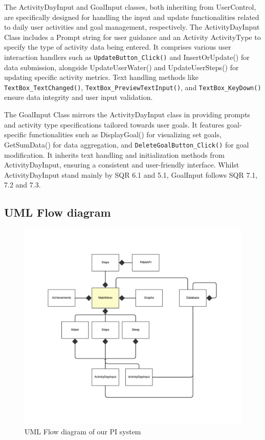 \documentclass[12pt]{article}
\begin{document}
The ActivityDayInput and GoalInput classes, both inheriting from UserControl,
are specifically designed for handling the input and update functionalities
related to daily user activities and goal management, respectively. The
ActivityDayInput Class includes a Prompt string for user guidance and an
Activity ActivityType to specify the type of activity data being entered. It
comprises various user interaction handlers such as \texttt{UpdateButton\_Click()} and
InsertOrUpdate() for data submission, alongside UpdateUserWater() and
UpdateUserSteps() for updating specific activity metrics. Text handling methods
like \texttt{TextBox\_TextChanged()}, \texttt{TextBox\_PreviewTextInput()}, and
\texttt{TextBox\_KeyDown()} ensure data integrity and user input validation.\par

The GoalInput Class mirrors the ActivityDayInput class in providing prompts and
activity type specifications tailored towards user goals. It features
goal-specific functionalities such as DisplayGoal() for visualizing set goals,
GetSumData() for data aggregation, and \texttt{DeleteGoalButton\_Click()} for goal
modification. It inherits text handling and initialization methods from
ActivityDayInput, ensuring a consistent and user-friendly interface. Whilst ActivityDayInput stand mainly by SQR 6.1 and 5.1, GoalInput follows SQR 7.1, 7.2 and 7.3.\par

\newpage
\subsection{UML Flow diagram}

\begin{figure}[!ht]
  \centering
  \includegraphics[width = \linewidth]{UML Flow diagram}
  \caption{UML Flow diagram of our PI system}
  \label{fig:flow}
\end{figure}
\end{document}
